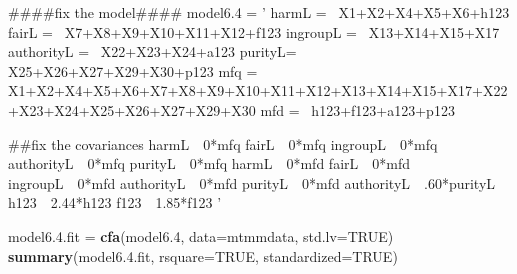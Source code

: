 \documentclass[english,man]{apa6}
\newenvironment{Shaded}{\begin{snugshade}}{\end{snugshade}}
\newcommand{\KeywordTok}[1]{\textcolor[rgb]{0.13,0.29,0.53}{\textbf{#1}}}
\newcommand{\DataTypeTok}[1]{\textcolor[rgb]{0.13,0.29,0.53}{#1}}
\newcommand{\DecValTok}[1]{\textcolor[rgb]{0.00,0.00,0.81}{#1}}
\newcommand{\FloatTok}[1]{\textcolor[rgb]{0.00,0.00,0.81}{#1}}
\newcommand{\StringTok}[1]{\textcolor[rgb]{0.31,0.60,0.02}{#1}}
\newcommand{\OtherTok}[1]{\textcolor[rgb]{0.56,0.35,0.01}{#1}}
\newcommand{\NormalTok}[1]{#1}
\newcounter{author}
\theoremstyle{definition}
\theoremstyle{definition}
\theoremstyle{definition}
\theoremstyle{remark}
\begin{document}
\begin{Shaded}
\begin{Highlighting}[]
\NormalTok{####fix the model####}
\NormalTok{model6.}\DecValTok{4}\NormalTok{ =}\StringTok{ '}
\StringTok{harmL =~ X1+X2+X4+X5+X6+h123}
\StringTok{fairL =~ X7+X8+X9+X10+X11+X12+f123}
\StringTok{ingroupL =~ X13+X14+X15+X17}
\StringTok{authorityL =~ X22+X23+X24+a123}
\StringTok{purityL=~ X25+X26+X27+X29+X30+p123}
\StringTok{mfq =~ X1+X2+X4+X5+X6+X7+X8+X9+X10+X11+X12+X13+X14+X15+X17+X22+X23+X24+X25+X26+X27+X29+X30}
\StringTok{mfd =~ h123+f123+a123+p123}

\StringTok{##fix the covariances}
\StringTok{harmL~~0*mfq}
\StringTok{fairL~~0*mfq}
\StringTok{ingroupL~~0*mfq}
\StringTok{authorityL~~0*mfq}
\StringTok{purityL~~0*mfq}
\StringTok{harmL~~0*mfd}
\StringTok{fairL~~0*mfd}
\StringTok{ingroupL~~0*mfd}
\StringTok{authorityL~~0*mfd}
\StringTok{purityL~~0*mfd}
\StringTok{authorityL~~.60*purityL}
\StringTok{h123~~2.44*h123}
\StringTok{f123~~1.85*f123}
\StringTok{'}

\NormalTok{model6.}\FloatTok{4.}\NormalTok{fit =}\StringTok{ }\KeywordTok{cfa}\NormalTok{(model6.}\DecValTok{4}\NormalTok{, }\DataTypeTok{data=}\NormalTok{mtmmdata, }\DataTypeTok{std.lv=}\OtherTok{TRUE}\NormalTok{)}
\KeywordTok{summary}\NormalTok{(model6.}\FloatTok{4.}\NormalTok{fit, }\DataTypeTok{rsquare=}\OtherTok{TRUE}\NormalTok{, }\DataTypeTok{standardized=}\OtherTok{TRUE}\NormalTok{)}
\end{Highlighting}
\end{Shaded}
\end{document}
